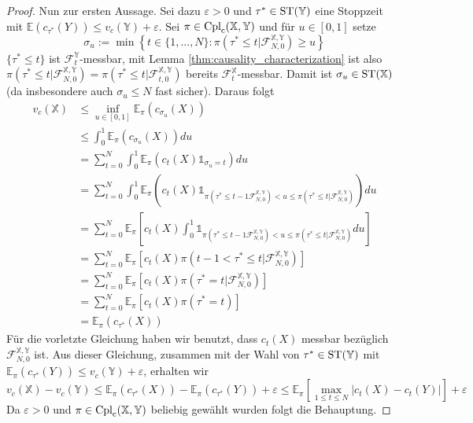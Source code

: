 \begin{proof}
Nun zur ersten Aussage. Sei dazu $\varepsilon > 0$ und $\tau^*\in \operatorname{ST}(\mathbb{Y})$ eine Stoppzeit mit $\mathbb{E}(c_{\tau^*}(Y)) \leq v_c(\mathbb{Y}) + \varepsilon$. Sei $\pi \in \operatorname{Cpl}_{\operatorname{c}}(\mathbb{X,Y})$ und für $u \in [0,1]$ setze 
$$\sigma_u := \min \left\{ t \in \{1,...,N\}: \pi\left(\tau^*\leq t \vert \mathcal{F}_{N,0}^\mathbb{X,Y}\right) \geq u\right\} $$
$\{\tau^* \leq t\}$ ist $\mathcal{F}_t^\mathbb{Y}$-messbar, mit Lemma \ref{thm:causality_characterization} ist also $\pi\left( \tau^* \leq t \vert \mathcal{F}_{N,0}^\mathbb{X,Y}\right) = \pi\left( \tau^* \leq t \vert \mathcal{F}_{t,0}^\mathbb{X,Y} \right)$ bereits $\mathcal{F}_t^\mathbb{X}$-messbar. Damit ist $\sigma_u \in \operatorname{ST}(\mathbb{X})$ (da insbesondere auch $\sigma_u \leq N$ fast sicher). Daraus folgt 
\begin{align*}
    v_c(\mathbb{X}) &\leq \inf_{u \in [0,1]} \mathbb{E}_\pi(c_{\sigma_u}(X)) \\
    &\leq \int_0^1 \mathbb{E}_\pi(c_{\sigma_u}(X)) du \\
    &= \sum_{t=0}^N \int_0^1 \mathbb{E}_\pi(c_t(X) \mathds{1}_{\sigma_u = t}) du\\
    &= \sum_{t=0}^N \int_0^1 \mathbb{E}_\pi(c_t(X) \mathds{1}_{\pi(\tau^*\leq t-1 \mathcal{F}_{N,0}^\mathbb{X,Y}) < u \leq \pi(\tau^*\leq t \vert \mathcal{F}_{N,0}^\mathbb{X,Y})}) du \\
    &= \sum_{t=0}^N \mathbb{E}_\pi\left[c_t(X) \int_0^1 \mathds{1}_{\pi(\tau^*\leq t-1 \mathcal{F}_{N,0}^\mathbb{X,Y}) < u \leq \pi(\tau^*\leq t \vert \mathcal{F}_{N,0}^\mathbb{X,Y})} du  \right] \\ 
    &= \sum_{t=0}^N \mathbb{E}_\pi\left[c_t(X) \pi\left(t-1 < \tau^* \leq t \vert \mathcal{F}_{N,0}^\mathbb{X,Y}\right) \right]  \\
    &= \sum_{t=0}^N \mathbb{E}_\pi\left[ c_{t}(X) \pi(\tau^*=t \vert \mathcal{F}_{N,0}^\mathbb{X,Y})\right] \\
    &= \sum_{t=0}^N \mathbb{E}_\pi\left[ c_t(X) \pi(\tau^*=t)\right] \\ 
    &= \mathbb{E}_\pi(c_{\tau^*}(X))
\end{align*}
Für die vorletzte Gleichung haben wir benutzt, dass $c_t(X)$ messbar bezüglich $\mathcal{F}_{N,0}^\mathbb{X,Y}$ ist. Aus dieser Gleichung, zusammen mit der Wahl von $\tau^* \in \operatorname{ST}(\mathbb{Y})$ mit $\mathbb{E}_\pi(c_{\tau^*}(Y)) \leq v_c(\mathbb{Y}) + \varepsilon$, erhalten wir
$$v_c(\mathbb{X}) - v_c(\mathbb{Y}) \leq \mathbb{E}_\pi(c_{\tau^*}(X)) - \mathbb{E}_\pi(c_{\tau^*}(Y)) + \varepsilon \leq \mathbb{E}_\pi\left[ \max_{1\leq t\leq N} |c_t(X) - c_t(Y)| \right] + \varepsilon$$
Da $\varepsilon>0$ und $\pi \in \operatorname{Cpl}_{\operatorname{c}}(\mathbb{X,Y})$ beliebig gewählt wurden folgt die Behauptung.
\end{proof}

